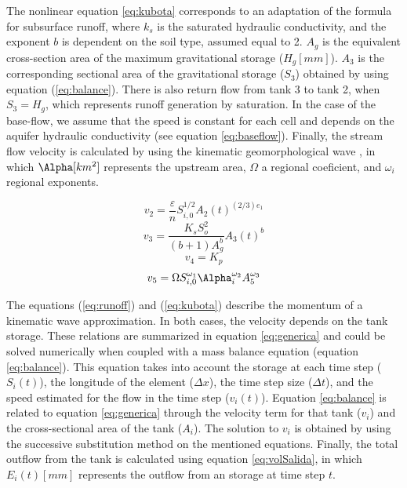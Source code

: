 \documentclass[hess, manuscript]{copernicus}
\begin{document}
The nonlinear equation \ref{eq:kubota} corresponds to an adaptation of the \citet{Kubota1995} formula for subsurface runoff, where $k_s$ is the saturated hydraulic conductivity, and the exponent $b$ is dependent on the soil type, assumed equal to 2.  $A_g$ is the equivalent cross-section area of the maximum gravitational storage ($H_g [mm]$).  $A_3$ is the corresponding sectional area of the gravitational storage ($S_3$) obtained by using equation (\ref{eq:balance}). There is also return flow from tank 3 to tank 2, when $S_3=H_g$, which represents runoff generation by saturation. In the case of the base-flow, we assume that the speed is constant for each cell and depends on the aquifer hydraulic conductivity (see equation \ref{eq:baseflow}). Finally, the stream flow velocity is calculated by using the kinematic geomorphological wave \citep{Velez2001, Frances2007b}, in which $\Alpha [km^2]$ represents the upstream area, $\Omega$ a regional coeficient, and $\omega_i$ regional exponents.

\begin{equation}
 v_{2} = \frac{\varepsilon}{n}  S_{i,0}^{1/2} A_{2}(t)^{(2/3) e_1}
    \label{eq:runoff}
\end{equation}
\begin{equation}
 v_3 = \frac{K_s S_{o}^{2}}{(b+1) A_{g}^{b}} A_{3}(t)^{b}
    \label{eq:kubota}
\end{equation}
\begin{equation}
    v_4 = K_p
    \label{eq:baseflow}
\end{equation}
\begin{equation}
    v_5 = \Omega S_{i,0}^{\omega_1} \Alpha_{i}^{\omega_2} A_{5}^{\omega_3}
    \label{eq:kinematic}
\end{equation}

The equations (\ref{eq:runoff}) and (\ref{eq:kubota}) describe the momentum of a kinematic wave approximation. In both cases, the velocity depends on the tank storage. These relations are summarized in equation \ref{eq:generica} and could be solved numerically when coupled with a mass balance equation (equation \ref{eq:balance}). This equation takes into account the storage at each time step ($S_{i}(t)$), the longitude of the element ($\Delta x$), the time step size ($\Delta t$), and the speed estimated for the flow in the time step ($v_{i}(t)$). Equation \ref{eq:balance} is related to equation \ref{eq:generica} through the velocity term for that tank ($v_{i}$) and the cross-sectional area of the tank ($A_{i}$). The solution to $v_{i}$ is obtained by using the successive substitution method \citep{Chapra2012} on the mentioned equations.  Finally, the total outflow from the tank is calculated using equation \ref{eq:volSalida}, in which $E_{i}(t) [mm]$ represents the outflow from an storage at time step $t$.    
\end{document}
